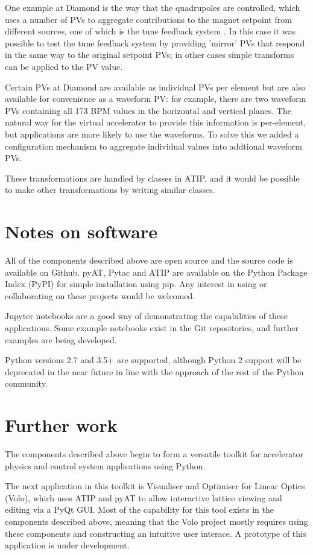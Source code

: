 \documentclass[a4paper,
               keeplastbox,   %
               ]{jacow}
\begin{document}
One example at Diamond is the way that the quadrupoles are 
controlled, which uses a number of PVs to aggregate contributions to the magnet
setpoint from different sources, one of which is the tune feedback system \cite{feedbacks}.
In this case it was possible to test the tune feedback system by providing 'mirror'
PVs that respond in the same way to the original setpoint PVs; in other cases
simple transforms can be applied to the PV value.

Certain PVs at Diamond are available as individual PVs per element but are also
available for convenience as a waveform PV: for example, there are two waveform
PVs containing all 173 BPM values in the horizontal and vertical planes. The natural
way for the virtual accelerator to provide this information is per-element, but
applications are more likely to use the waveforms. To solve this we added a
configuration mechanism to aggregate individual values into addtional waveform PVs.

These transformations are handled by classes in ATIP, and it would be possible to
make other transformations by writing similar classes.

\section{Notes on software}

All of the components described above are open source and the source code is available
on Github. pyAT, Pytac and ATIP are available on the Python Package Index (PyPI) \cite{pypi} 
for simple installation using pip. Any interest in using or collaborating on these 
projects would be welcomed.

Jupyter notebooks are a good way of demonstrating the capabilities of these applications.
Some example notebooks exist in the Git repositories, and further examples are being developed.

Python versions 2.7 and 3.5+ are supported, although Python 2 support will be deprecated
in the near future in line with the approach of the rest of the Python community.

\section{Further work}

The components described above begin to form a versatile toolkit for accelerator
physics and control system applications using Python. 

The next application in this toolkit is Visualiser and Optimiser for Linear Optics
(Volo), which uses ATIP and pyAT to allow interactive lattice viewing and editing
via a PyQt GUI. Most of the capability for this tool exists in the components
described above, meaning that the Volo project mostly requires using these components
and constructing an intuitive user interace. A prototype of this application is under
development.
\end{document}
